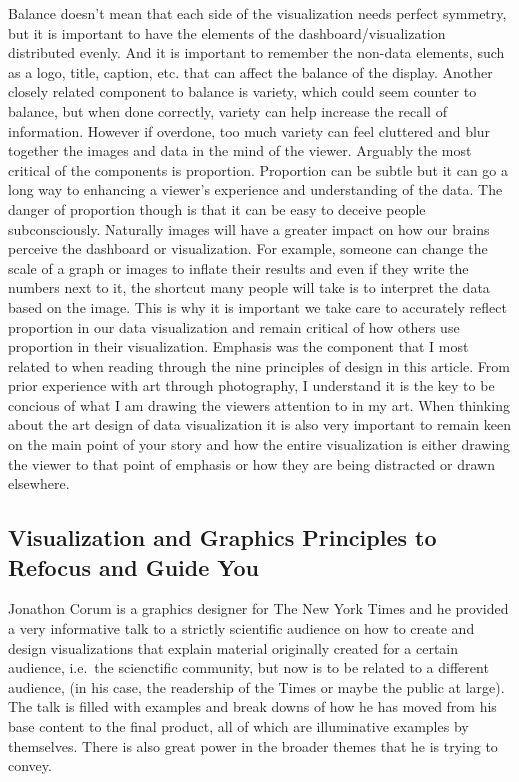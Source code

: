 \documentclass[]{book}
\theoremstyle{definition}
\theoremstyle{definition}
\theoremstyle{definition}
\theoremstyle{remark}
\begin{document}
Balance doesn't mean that each side of the visualization needs perfect
symmetry, but it is important to have the elements of the
dashboard/visualization distributed evenly. And it is important to
remember the non-data elements, such as a logo, title, caption, etc.
that can affect the balance of the display. Another closely related
component to balance is variety, which could seem counter to balance,
but when done correctly, variety can help increase the recall of
information. However if overdone, too much variety can feel cluttered
and blur together the images and data in the mind of the viewer.
Arguably the most critical of the components is proportion. Proportion
can be subtle but it can go a long way to enhancing a viewer's
experience and understanding of the data. The danger of proportion
though is that it can be easy to deceive people subconsciously.
Naturally images will have a greater impact on how our brains perceive
the dashboard or visualization. For example, someone can change the
scale of a graph or images to inflate their results and even if they
write the numbers next to it, the shortcut many people will take is to
interpret the data based on the image. This is why it is important we
take care to accurately reflect proportion in our data visualization and
remain critical of how others use proportion in their visualization.
Emphasis was the component that I most related to when reading through
the nine principles of design in this article. From prior experience
with art through photography, I understand it is the key to be concious
of what I am drawing the viewers attention to in my art. When thinking
about the art design of data visualization it is also very important to
remain keen on the main point of your story and how the entire
visualization is either drawing the viewer to that point of emphasis or
how they are being distracted or drawn elsewhere.

\subsection{Visualization and Graphics Principles to Refocus and Guide
You}\label{visualization-and-graphics-principles-to-refocus-and-guide-you}

Jonathon Corum is a graphics designer for The New York Times and he
provided a very informative talk to a strictly scientific audience on
how to create and design visualizations that explain material originally
created for a certain audience, i.e.~the scienctific community, but now
is to be related to a different audience, (in his case, the readership
of the Times or maybe the public at large). The talk is filled with
examples and break downs of how he has moved from his base content to
the final product, all of which are illuminative examples by themselves.
There is also great power in the broader themes that he is trying to
convey.
\end{document}
